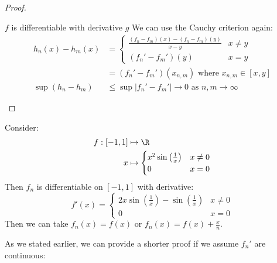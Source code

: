\documentclass[../Main.tex]{subfiles}
\begin{document}
\begin{proof}
\begin{subproof}{$f$ is differentiable with derivative $g$}
        We can use the Cauchy criterion again:
        \begin{align*}
            h_n(x) - h_m(x) &=
            \begin{cases}
                \frac{(f_n - f_m)(x) - (f_n - f_m)(y)}{x - y} & x \neq y \\
                (f_n' - f_m')(y) & x = y
            \end{cases} \\
            &= (f_n' - f_m')(x_{n, m}) \text{ where } x_{n, m} \in [x, y] \\
            \sup (h_n - h_m) &\leq \sup |f_n' - f_m'| \to 0 \text{ as } n, m \to \infty
        \end{align*}
    \end{subproof}
\end{proof}
\begin{example}
    Consider:
    \begin{align*}
        f : [-1, 1] &\mapsto \R\\
        x &\mapsto \begin{cases}
            x^2 \sin\left(\frac{1}{x}\right) & x \neq 0 \\
            0 & x = 0
         \end{cases}
    \end{align*}
    Then $f_n$ is differentiable on $[-1, 1]$ with derivative:
    \begin{equation*}
        f'(x) = 
        \begin{cases}
            2x\sin\left(\frac{1}{x}\right) - \sin\left(\frac{1}{x}\right) & x \neq 0 \\
            0 & x = 0
        \end{cases}
    \end{equation*}
    Then we can take $f_n(x) = f(x)$ or $f_n(x) = f(x) + \frac{x}{n}$.
\end{example}
As we stated earlier, we can provide a shorter proof if we assume $f_n'$ are continuous:
\end{document}
